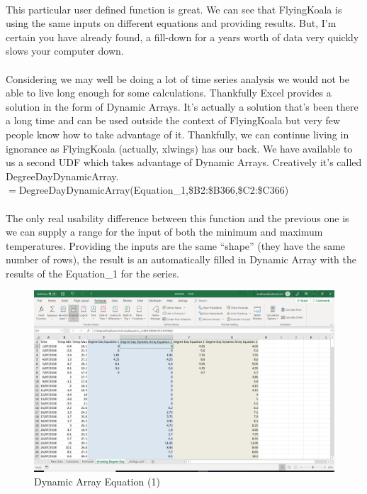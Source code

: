 \documentclass[12pt,a4paper,twoside,openright,titlepage]{article}
\begin{document}
\paragraph{} This particular user defined function is great. We can see that FlyingKoala is using the same inputs on different equations and providing results. But, I'm certain you have already found, a fill-down for a years worth of data very quickly slows your computer down.

\paragraph{} Considering we may well be doing a lot of time series analysis we would not be able to live long enough for some calculations. Thankfully Excel provides a solution in the form of Dynamic Arrays. It's actually a solution that's been there a long time and can be used outside the context of FlyingKoala but very few people know how to take advantage of it. Thankfully, we can continue living in ignorance as FlyingKoala (actually, xlwings) has our back. We have available to us a second UDF which takes advantage of Dynamic Arrays. Creatively it's called DegreeDayDynamicArray.\\

$=$DegreeDayDynamicArray(Equation\_1,\$B2:\$B366,\$C2:\$C366) 

\paragraph{} The only real usability difference between this function and the previous one is we can supply a range for the input of both the minimum and maximum temperatures. Providing the inputs are the same ``shape'' (they have the same number of rows), the result is an automatically filled in Dynamic Array with the results of the Equation\_1 for the series.

\begin{figure}[h!]
	\centering
	\includegraphics[scale=0.4]{images/degreedaydynamicarray_equation_1.PNG}
	\caption{Dynamic Array Equation (1)}
\end{figure}
\end{document}
